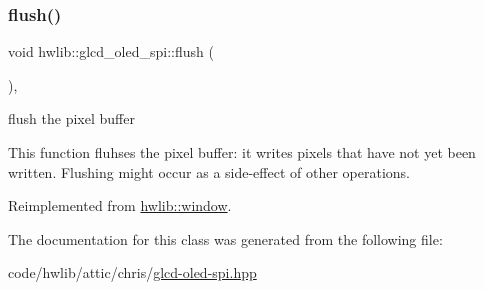 \subsubsection{\texorpdfstring{flush()}{flush()}}
{\footnotesize\ttfamily void hwlib\+::glcd\+\_\+oled\+\_\+spi\+::flush (\begin{DoxyParamCaption}{ }\end{DoxyParamCaption})\hspace{0.3cm}{\ttfamily [inline]}, {\ttfamily [virtual]}}



flush the pixel buffer 

This function fluhses the pixel buffer\+: it writes pixels that have not yet been written. Flushing might occur as a side-\/effect of other operations. 

Reimplemented from \hyperlink{classhwlib_1_1window_a2b654a98872d174173e1df24a444c949}{hwlib\+::window}.



The documentation for this class was generated from the following file\+:\begin{DoxyCompactItemize}
\item 
code/hwlib/attic/chris/\hyperlink{glcd-oled-spi_8hpp}{glcd-\/oled-\/spi.\+hpp}\end{DoxyCompactItemize}
